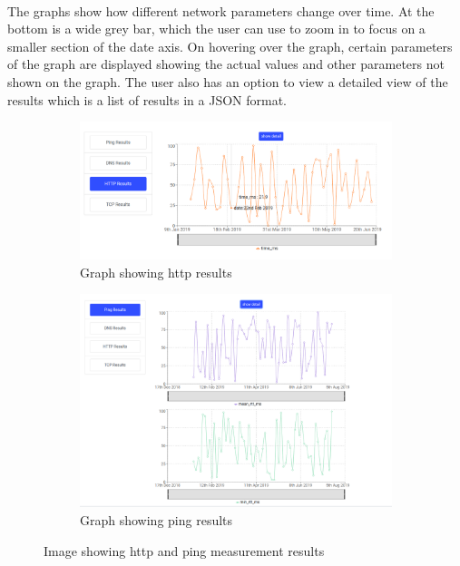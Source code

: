 \paragraph{}
The graphs show how different network parameters change over time. At the bottom is a wide grey bar, which the user can use to zoom in to focus on a smaller section of the date axis. On hovering over the graph, certain parameters of the graph are displayed showing the actual values and other parameters not shown on the graph. The user also has an option to view a detailed view of the results which is a list of results in a JSON format.
\begin{figure}
	\begin{subfigure}{.5\textwidth}
		\centering
		\includegraphics[width=.8\linewidth]{images/httpGraph}
		\caption{Graph showing http results}
		\label{fig:sfig7}
	\end{subfigure}
	\begin{subfigure}{.5\textwidth}
		\centering
		\includegraphics[width=.8\linewidth]{images/pingGraph}
		\caption{Graph showing ping results}
		\label{fig:sfig8}
	\end{subfigure}
	\caption{Image showing http and ping measurement results}
\label{fig:fig1}
\end{figure}











